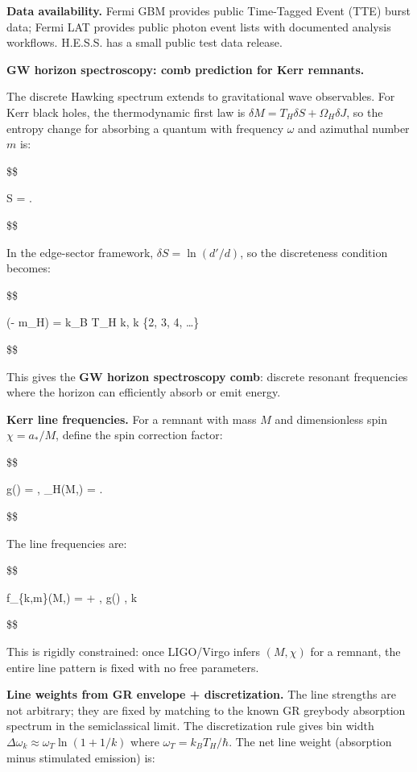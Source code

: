 \documentclass[11pt,a4paper]{article}
\theoremstyle{remark}
\begin{document}
\textbf{Data availability.} Fermi GBM provides public Time-Tagged Event (TTE)
burst data; Fermi LAT provides public photon event lists with documented
analysis workflows. H.E.S.S. has a small public test data release.

\textbf{GW horizon spectroscopy: comb prediction for Kerr remnants.}

The discrete Hawking spectrum extends to gravitational wave observables. For
Kerr black holes, the thermodynamic first law is \(\delta M = T_H \delta S +
\Omega_H \delta J\), so the entropy change for absorbing a quantum with
frequency \(\omega\) and azimuthal number \(m\) is:

\$\$

\delta S = .

\$\$

In the edge-sector framework, \(\delta S = \ln(d'/d)\), so the discreteness
condition becomes:

\$\$

\hbar(\omega - m\Omega\_H) = k\_B T\_H \ln k, \qquad k \in \{2, 3, 4, \ldots\}

\$\$

This gives the \textbf{GW horizon spectroscopy comb}: discrete resonant frequencies
where the horizon can efficiently absorb or emit energy.

\textbf{Kerr line frequencies.} For a remnant with mass \(M\) and dimensionless spin
\(\chi = a_*/M\), define the spin correction factor:

\$\$

g(\chi) = , \qquad
\Omega\_H(M,\chi) =  \cdot {}.

\$\$

The line frequencies are:

\$\$

f\_\{k,m\}(M,\chi) =  +  , g(\chi) , \ln k

\$\$

This is rigidly constrained: once LIGO/Virgo infers \((M, \chi)\) for a remnant,
the entire line pattern is fixed with no free parameters.

\textbf{Line weights from GR envelope + discretization.} The line strengths are not
arbitrary; they are fixed by matching to the known GR greybody absorption
spectrum in the semiclassical limit. The discretization rule gives bin width
\(\Delta\omega_k \approx \omega_T \ln(1 + 1/k)\) where \(\omega_T = k_B T_H/\hbar\).
The net line weight (absorption minus stimulated emission) is:
\end{document}
